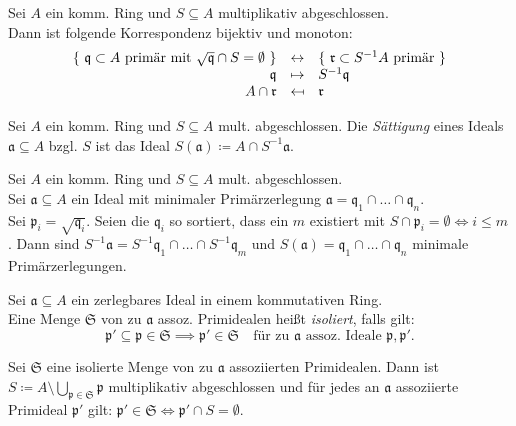 \documentclass{cheat-sheet}
\newcommand{\aaa}{\mathfrak{a}}
\newcommand{\ppp}{\mathfrak{p}}
\newcommand{\qqq}{\mathfrak{q}}
\newcommand{\rrr}{\mathfrak{r}}
\begin{document}
\begin{kor}
  Sei $A$ ein komm. Ring und $S \subseteq A$ multiplikativ abgeschlossen. \\
  Dann ist folgende Korrespondenz bijektiv und monoton:
  \[
    \begin{array}{r c l}
      \{ \text{ $\qqq \subset A$ primär mit $\sqrt{\qqq} \cap S = \emptyset$ } \} & \leftrightarrow & \{ \text{ $\rrr \subset S^{-1} A$ primär } \} \\
      \qqq & \mapsto & S^{-1} \qqq \\
      A \cap \rrr & \mapsfrom & \rrr
    \end{array}
  \]
\end{kor}


\begin{defn}
  Sei $A$ ein komm. Ring und $S \subseteq A$ mult. abgeschlossen.
  Die \emph{Sättigung} eines Ideals $\aaa \subseteq A$ bzgl. $S$ ist das Ideal $S(\aaa) \coloneqq A \cap S^{-1} \aaa$.
\end{defn}

\begin{prop}
  Sei $A$ ein komm. Ring und $S \subseteq A$ mult. abgeschlossen. \\
  Sei $\aaa \subseteq A$ ein Ideal mit minimaler Primärzerlegung $\aaa = \qqq_1 \cap \ldots \cap \qqq_n$. \\
  Sei $\ppp_i = \sqrt{\qqq_i}$.
  Seien die $\qqq_i$ so sortiert, dass ein $m$ existiert mit $S \cap \ppp_i = \emptyset \iff i \leq m$.
  Dann sind $S^{-1} \aaa = S^{-1} \qqq_1 \cap \ldots \cap S^{-1} \qqq_m$ und $S(\aaa) = \qqq_1 \cap \ldots \cap \qqq_n$ minimale Primärzerlegungen.
\end{prop}

\begin{defn}
  Sei $\aaa \subseteq A$ ein zerlegbares Ideal in einem kommutativen Ring. \\
  Eine Menge $\mathfrak{S}$ von zu $\aaa$ assoz. Primidealen heißt \emph{isoliert}, falls gilt:
  \[
    \ppp' \subseteq \ppp \in \mathfrak{S} \implies \ppp' \in \mathfrak{S}
    \quad \text{für zu $\aaa$ assoz. Ideale $\ppp, \ppp'$.}
  \]
\end{defn}

\begin{prop}
  Sei $\mathfrak{S}$ eine isolierte Menge von zu $\aaa$ assoziierten Primidealen.
  Dann ist $S \coloneqq A \setminus \bigcup_{\ppp \in \mathfrak{S}} \ppp$ multiplikativ abgeschlossen und für jedes an $\aaa$ assoziierte Primideal $\ppp'$ gilt: $\ppp' \in \mathfrak{S} \iff \ppp' \cap S = \emptyset$.
\end{prop}
\end{document}
